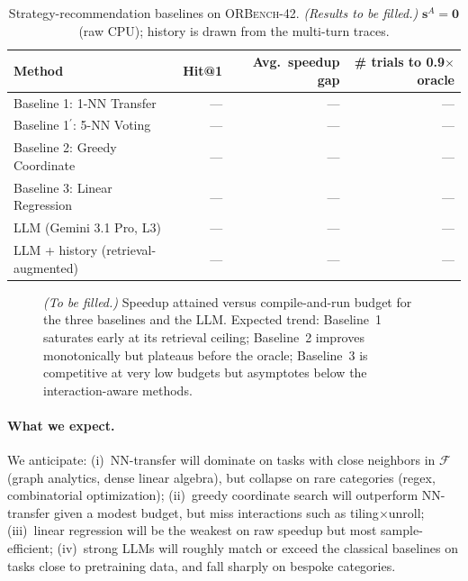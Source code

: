 \documentclass{article}
\begin{document}
\begin{table}[ht]
\centering
\small
\begin{tabular}{@{}lrrr@{}}
\toprule
\textbf{Method} & \textbf{Hit@1} & \textbf{Avg.\ speedup gap} & \textbf{\# trials to 0.9$\times$oracle} \\
\midrule
Baseline 1: 1-NN Transfer       & --- & --- & --- \\
Baseline 1$^\prime$: 5-NN Voting & --- & --- & --- \\
Baseline 2: Greedy Coordinate    & --- & --- & --- \\
Baseline 3: Linear Regression    & --- & --- & --- \\
\midrule
LLM (Gemini 3.1 Pro, L3)          & --- & --- & --- \\
LLM + history (retrieval-augmented) & --- & --- & --- \\
\bottomrule
\end{tabular}
\caption{Strategy-recommendation baselines on \textsc{ORBench}-42.
\emph{(Results to be filled.)} $\mathbf{s}^A = \mathbf{0}$ (raw CPU);
history is drawn from the multi-turn traces.}
\label{tab:strategy}
\end{table}

\begin{figure}[ht]
\centering
\caption{\emph{(To be filled.)} Speedup attained versus compile-and-run
budget for the three baselines and the LLM. Expected trend: Baseline~1
saturates early at its retrieval ceiling; Baseline~2 improves
monotonically but plateaus before the oracle; Baseline~3 is
competitive at very low budgets but asymptotes below the
interaction-aware methods.}
\label{fig:strategy-budget}
\end{figure}

\paragraph{What we expect.}
We anticipate: (i)~NN-transfer will dominate on tasks with close
neighbors in $\mathcal{F}$ (graph analytics, dense linear algebra),
but collapse on rare categories (regex, combinatorial optimization);
(ii)~greedy coordinate search will outperform NN-transfer given a
modest budget, but miss interactions such as tiling$\times$unroll;
(iii)~linear regression will be the weakest on raw speedup but most
sample-efficient; (iv)~strong LLMs will roughly match or exceed the
classical baselines on tasks close to pretraining data, and fall
sharply on bespoke categories.
\end{document}
